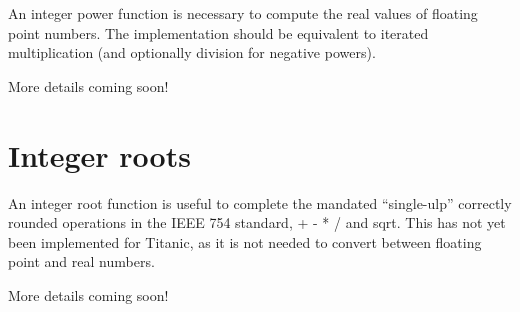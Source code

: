 \documentclass[letterpaper,10pt]{article}
\begin{document}
An integer power function is necessary to compute the real values of floating point numbers. The implementation should be equivalent to iterated multiplication (and optionally division for negative powers).

More details coming soon!

\section{Integer roots}

An integer root function is useful to complete the mandated ``single-ulp'' correctly rounded operations in the IEEE 754 standard, + - * / and sqrt. This has not yet been implemented for Titanic, as it is not needed to convert between floating point and real numbers.

More details coming soon!

%
%
\end{document}

